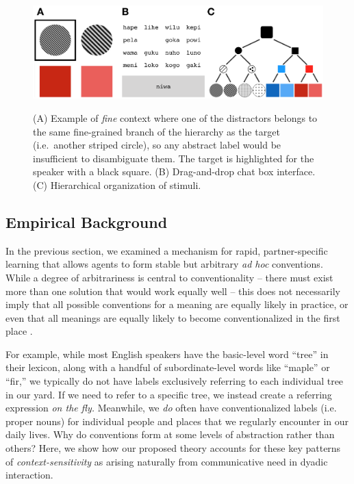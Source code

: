 
\begin{figure}[t]
\begin{center}
{\includegraphics[scale=.63]{./figures/Sec2-design.png}}
{\caption{{(A) Example of \emph{fine} context where one of the distractors belongs to the same fine-grained branch of the hierarchy as the target (i.e.\ another striped circle), so any abstract label would be insufficient to disambiguate them. The target is highlighted for the speaker with a black square. (B) Drag-and-drop chat box interface. (C) Hierarchical organization of stimuli.\label{fig:context_design}}}}
\vspace{-2ex}
\end{center}
\end{figure}

\subsection{Empirical Background}

In the previous section, we examined a mechanism for rapid, partner-specific learning that allows agents to form stable but arbitrary \emph{ad hoc} conventions. 
While a degree of arbitrariness is central to conventionality -- there must exist more than one solution that would work equally well -- this does not necessarily imply that all possible conventions for a meaning are equally likely in practice, or even that all meanings are equally likely to become conventionalized in the first place \cite{HawkinsGoldstone16_SocialConventions}.

For example, while most English speakers have the basic-level word ``tree'' in their lexicon, along with a handful of subordinate-level words like ``maple'' or ``fir,'' we typically do not have labels exclusively referring to each individual tree in our yard.
If we need to refer to a specific tree, we instead create a referring expression \emph{on the fly.}
Meanwhile, we \emph{do} often have conventionalized labels (i.e. proper nouns) for individual people and places that we regularly encounter in our daily lives.
Why do conventions form at some levels of abstraction rather than others?
Here, we show how our proposed theory accounts for these key patterns of \emph{context-sensitivity} as arising naturally from communicative need in dyadic interaction.


